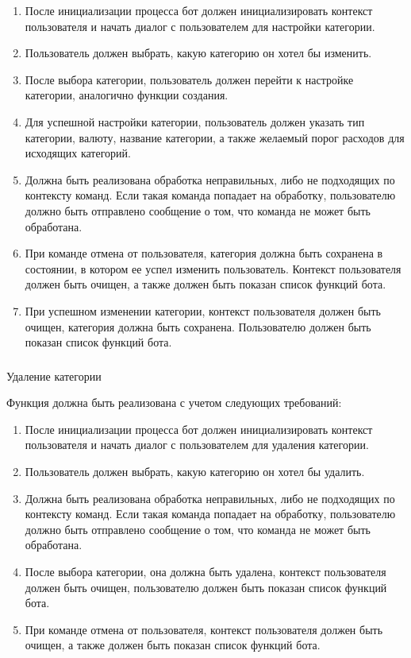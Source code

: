 \begin{enumerate}
	\item После инициализации процесса бот должен инициализировать контекст пользователя и начать диалог с пользователем для настройки категории.
	\item Пользователь должен выбрать, какую категорию он хотел бы изменить.
	\item После выбора категории, пользователь должен перейти к настройке категории, аналогично функции создания.
	\item Для успешной настройки категории, пользователь должен указать тип категории, валюту, название категории, а также желаемый порог расходов для исходящих категорий.
	\item Должна быть реализована обработка неправильных, либо не подходящих по контексту команд. Если такая команда попадает на обработку, пользователю должно быть отправлено сообщение о том, что команда не может быть обработана.
	\item При команде отмена от пользователя, категория должна быть сохранена в состоянии, в котором ее успел изменить пользователь. Контекст пользователя должен быть очищен, а также должен быть показан список функций бота.
	\item При успешном изменении категории, контекст пользователя должен быть очищен, категория должна быть сохранена. Пользователю должен быть показан список функций бота.
\end{enumerate}

\subsubsection{} Удаление категории
\label{sec:domain:specification:deletecategory}

Функция должна быть реализована с учетом следующих требований:

\begin{enumerate}
	\item После инициализации процесса бот должен инициализировать контекст пользователя и начать диалог с пользователем для удаления категории.
	\item Пользователь должен выбрать, какую категорию он хотел бы удалить.
	\item Должна быть реализована обработка неправильных, либо не подходящих по контексту команд. Если такая команда попадает на обработку, пользователю должно быть отправлено сообщение о том, что команда не может быть обработана.
	\item После выбора категории, она должна быть удалена, контекст пользователя должен быть очищен, пользователю должен быть показан список функций бота.
	\item При команде отмена от пользователя, контекст пользователя должен быть очищен, а также должен быть показан список функций бота.
\end{enumerate}


